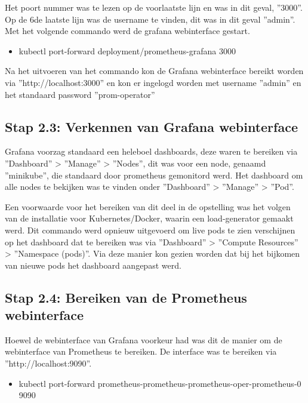 Het poort nummer was te lezen op de voorlaatste lijn en was in dit geval, ''3000''. Op de 6de laatste lijn was de username te vinden, dit was in dit geval ''admin''. Met het volgende commando werd de grafana webinterface gestart. 

\begin{itemize}
    \item kubectl port-forward deployment/prometheus-grafana 3000
\end{itemize}

Na het uitvoeren van het commando kon de Grafana webinterface bereikt worden via ''http://localhost:3000'' en kon er ingelogd worden met username ''admin'' en het standaard password ''prom-operator''

\subsection{Stap 2.3: Verkennen van Grafana webinterface}

Grafana voorzag standaard een heleboel dashboards, deze waren te bereiken via ''Dashboard'' > ''Manage'' > ''Nodes'', dit was voor een node, genaamd ''minikube'', die standaard door prometheus gemonitord werd. Het dashboard om alle nodes te bekijken was te vinden onder ''Dashboard'' > ''Manage'' > ''Pod''. 

Een voorwaarde voor het bereiken van dit deel in de opstelling was het volgen van de installatie voor Kubernetes/Docker, waarin een load-generator gemaakt werd. Dit commando werd opnieuw uitgevoerd om live pods te zien verschijnen op het dashboard dat te bereiken was via ''Dashboard'' > ''Compute Resources'' > ''Namespace (pods)''. Via deze manier kon gezien worden dat bij het bijkomen van nieuwe pods het dashboard aangepast werd. 

\subsection{Stap 2.4: Bereiken van de Prometheus webinterface}

Hoewel de webinterface van Grafana voorkeur had was dit de manier om de webinterface van Prometheus te bereiken. De interface was te bereiken via ''http://localhost:9090''.

\begin{itemize}
    \item kubectl port-forward prometheus-prometheus-prometheus-oper-prometheus-0 9090
\end{itemize}

